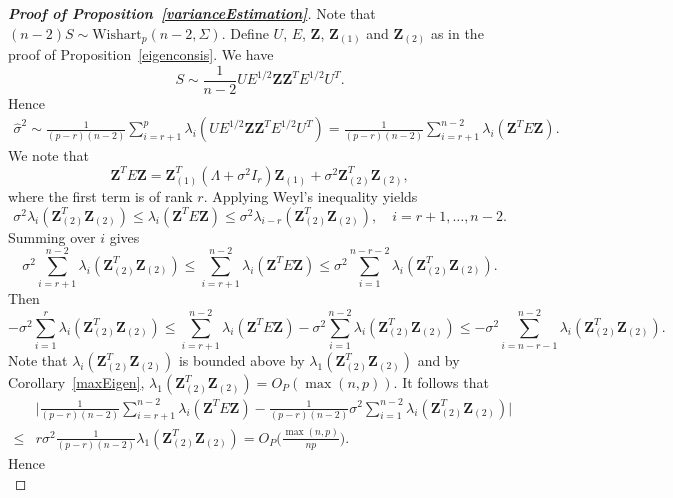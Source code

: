 \documentclass[review]{elsarticle}
\newcommand{\bZ}{\mathbf{Z}}
\theoremstyle{plain}
\theoremstyle{definition}
\theoremstyle{remark}
\begin{document}
\begin{proof}[\textbf{Proof of Proposition~\ref{varianceEstimation}}]
    Note that $(n-2)S\sim \mathrm{Wishart}_p (n-2,\Sigma)$.
    Define $U$, $E$, $\bZ$, $\bZ_{(1)}$ and $\bZ_{(2)}$ as in the proof of Proposition~\ref{eigenconsis}.
    We have
    $$
        S\sim \frac{1}{n-2} U E^{1/2} \bZ \bZ^T E^{1/2} U^T.
    $$
    Hence
    \begin{equation*}
        \begin{aligned}
            \hat{\sigma}^2\sim
            \frac{1}{(p-r)(n-2)}\sum_{i=r+1}^p \lambda_i (U E^{1/2} \bZ \bZ^T E^{1/2} U^T)
            =
            \frac{1}{(p-r)(n-2)}\sum_{i=r+1}^{n-2} \lambda_i ( \bZ^T E \bZ).
        \end{aligned}
    \end{equation*}
    We note that
    $$
    \bZ^T E \bZ =\bZ_{(1)}^T (\Lambda +\sigma^2 I_r) \bZ_{(1)}+\sigma^2 \bZ_{(2)}^T \bZ_{(2)},
    $$
 where the first term is of rank $r$.
    Applying Weyl's inequality yields
    $$
    \sigma^2\lambda_i(\bZ_{(2)}^T \bZ_{(2)}) \leq \lambda_i(\bZ^T E \bZ)\leq
    \sigma^2\lambda_{i-r}(\bZ_{(2)}^T \bZ_{(2)}),
    \quad
    \textrm{$i=r+1,\ldots, n-2$}.
    $$
    Summing over $i$ gives
    $$
    \sigma^2\sum_{i=r+1}^{n-2}\lambda_i(\bZ_{(2)}^T \bZ_{(2)}) \leq \sum_{i=r+1}^{n-2}\lambda_i(\bZ^T E \bZ)\leq
    \sigma^2\sum_{i=1}^{n-r-2}\lambda_{i}(\bZ_{(2)}^T \bZ_{(2)}).
    $$
    Then
    $$
    -\sigma^2\sum_{i=1}^{r}\lambda_i(\bZ_{(2)}^T \bZ_{(2)}) \leq \sum_{i=r+1}^{n-2}\lambda_i(\bZ^T E \bZ)
    -\sigma^2\sum_{i=1}^{n-2}\lambda_{i}(\bZ_{(2)}^T \bZ_{(2)})
    \leq
    -\sigma^2\sum_{i=n-r-1}^{n-2}\lambda_{i}(\bZ_{(2)}^T \bZ_{(2)}).
    $$
    Note that $\lambda_i(\bZ_{(2)}^T \bZ_{(2)})$ is bounded above by $\lambda_1(\bZ_{(2)}^T \bZ_{(2)})$ and by Corollary~\ref{maxEigen}, $\lambda_1 (\bZ_{(2)}^T \bZ_{(2)})=O_P(\max(n,p))$. It follows that
     \begin{equation*}
         \begin{aligned}
             &\Big|\frac{1}{(p-r)(n-2)}\sum_{i=r+1}^{n-2}\lambda_i(\bZ^T E \bZ)-
    \frac{1}{(p-r)(n-2)} \sigma^2\sum_{i=1}^{n-2}\lambda_{i}(\bZ_{(2)}^T \bZ_{(2)})\Big|
             \\
             \leq & r\sigma^2\frac{1}{(p-r)(n-2)} \lambda_1 (\bZ_{(2)}^T \bZ_{(2)})=O_P\Big(\frac{\max(n,p)}{np}\Big).
         \end{aligned}
     \end{equation*}
    Hence
     \begin{equation*}

\end{equation*}
\end{proof}
\end{document}
